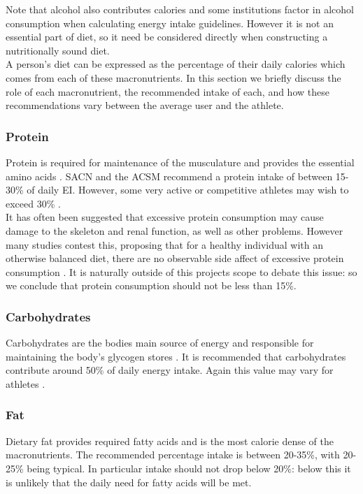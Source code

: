 \documentclass{article}
\begin{document}
Note that alcohol also contributes calories and some institutions factor in alcohol consumption when calculating energy intake guidelines. However it is not an essential part of diet, so it need be considered directly when constructing a nutritionally sound diet.\\
A person's diet can be expressed as the percentage of their daily calories which comes from each of these macronutrients. In this section we briefly discuss the role of each macronutrient, the recommended intake of each, and how these recommendations vary between the average user and the athlete.

\subsubsection{Protein}
Protein is required for maintenance of the musculature and provides the essential amino acids \cite[ch.~15]{FoodIntakeAndEnergy}. SACN and the ACSM recommend a protein intake of between 15-30\% of daily EI. However, some very active or competitive athletes may wish to exceed 30\% \cite{ACSMNutritionForAthletes}.\\
It has often been suggested that excessive protein consumption may cause damage to the skeleton and renal function, as well as other problems\cite{ProteinCanAffectBone}. However many studies contest this, proposing that for a healthy individual with an otherwise balanced diet, there are no observable side affect of excessive protein consumption \cite{ProteinNotAffectBone,ProteinNotAffectRenal}. It is naturally outside of this projects scope to debate this issue: so we conclude that protein consumption should not be less than 15\%.

\subsubsection{Carbohydrates}
Carbohydrates are the bodies main source of energy and responsible for maintaining the body's glycogen stores \cite[ch.~15]{FoodIntakeAndEnergy}. It is recommended that carbohydrates contribute around 50\% of daily energy intake. Again this value may vary for athletes \cite{ACSMNutritionForAthletes}.

\subsubsection{Fat}
Dietary fat provides required fatty acids and is the most calorie dense of the macronutrients. The recommended percentage intake is between 20-35\%, with 20-25\% being typical. In particular intake should not drop below 20\%: below this it is unlikely that the daily need for fatty acids will be met.

	



\end{document}
